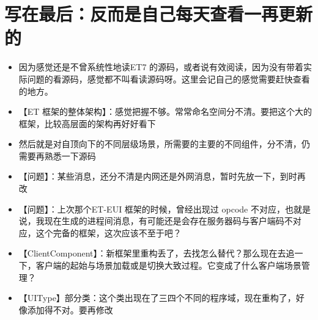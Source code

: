 \documentclass[9pt, b5paper]{article}
\begin{document}
\section{写在最后：反而是自己每天查看一再更新的}
\label{sec-12}
\begin{itemize}
\item 因为感觉还是不曾系统性地读ET7 的源码，或者说有效阅读，因为没有带着实际问题的看源码，感觉都不叫看读源码呀。这里会记自己的感觉需要赶快查看的地方。
\item 【ET 框架的整体架构】：感觉把握不够。常常命名空间分不清。要把这个大的框架，比较高层面的架构再好好看下
\item 然后就是对自顶向下的不同层级场景，所需要的主要的不同组件，分不清，仍需要再熟悉一下源码
\item 【问题】：某些消息，还分不清是内网还是外网消息，暂时先放一下，到时再改
\item 【问题】：上次那个ET-EUI 框架的时候，曾经出现过 opcode 不对应，也就是说，我现在生成的进程间消息，有可能还是会存在服务器码与客户端码不对应，这个完备的框架，这次应该不至于吧？
\item 【ClientComponent】：新框架里重构丢了，去找怎么替代？那么现在去追一下，客户端的起始与场景加载或是切换大致过程。它变成了什么客户端场景管理？
\item 【UIType】部分类：这个类出现在了三四个不同的程序域，现在重构了，好像添加得不对。要再修改
\end{itemize}
\end{document}
